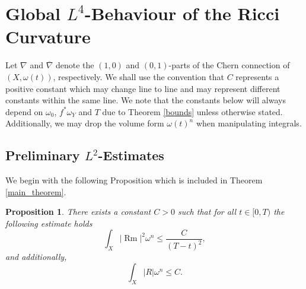\documentclass[12pt]{article}
\newtheorem{proposition}[theorem]{Proposition}
\numberwithin{equation}{section}
\DeclareMathOperator{\Rm}{Rm}
\newcommand{\oo}[1]{\overline{#1}}
\begin{document}
\section{Global $L^4$-Behaviour of the Ricci Curvature}

Let $\nabla$ and $\oo{\nabla}$ denote the $(1,0)$ and $(0,1)$-parts of the Chern connection of $(X,\omega(t))$, respectively. We shall use the convention that $C$ represents a positive constant which may change line to line and may represent different constants within the same line. We note that the constants below will always depend on $\omega_0$, $f^*\omega_Y$ and $T$ due to Theorem \ref{bounds} unless otherwise stated. Additionally, we may drop the volume form $\omega(t)^n$ when manipulating integrals.

\subsection{Preliminary $L^2$-Estimates}

We begin with the following Proposition which is included in Theorem \ref{main_theorem}.

\begin{proposition}
There exists a constant $C > 0$ such that for all $t \in [0,T)$ the following estimate holds
\begin{equation}\label{Rm_bound}
    \int_X |\Rm|^2 \omega^n \leq \frac{C}{(T-t)^2},
\end{equation}
and additionally,
\begin{equation}\label{L1_scalar_bound}
    \int_X |R| \omega^n \leq C.
\end{equation}
\end{proposition}
\end{document}
